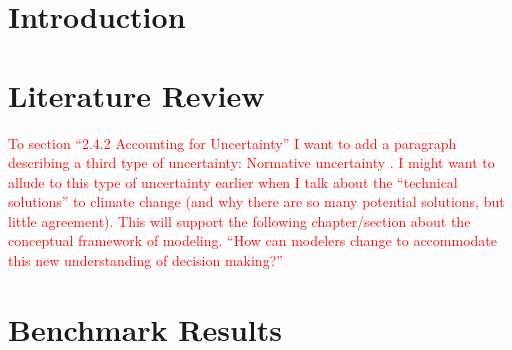\chapter{Introduction}
\chapter{Literature Review}
\label{chapter:lit-review}

\textcolor{red}{To section ``2.4.2 Accounting for Uncertainty'' I want to add 
a paragraph describing a third type of uncertainty: Normative uncertainty 
\cite{taebi_governing_2020}. I might want to allude to this type of uncertainty
earlier when I talk about the ``technical solutions'' to climate change (and why
there are so many potential solutions, but little agreement). This will support
the following chapter/section about the conceptual framework of modeling. ``How
can modelers change to accommodate this new understanding of decision making?''}




% 


\chapter{Benchmark Results}







